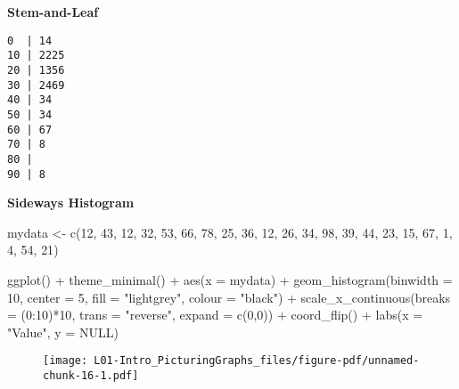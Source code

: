 \documentclass[
  letterpaper,
  DIV=11,
  numbers=noendperiod]{scrreprt}
\newenvironment{Shaded}{\begin{snugshade}}{\end{snugshade}}
\newcommand{\AttributeTok}[1]{\textcolor[rgb]{0.40,0.45,0.13}{#1}}
\newcommand{\ConstantTok}[1]{\textcolor[rgb]{0.56,0.35,0.01}{#1}}
\newcommand{\DecValTok}[1]{\textcolor[rgb]{0.68,0.00,0.00}{#1}}
\newcommand{\FunctionTok}[1]{\textcolor[rgb]{0.28,0.35,0.67}{#1}}
\newcommand{\NormalTok}[1]{\textcolor[rgb]{0.00,0.23,0.31}{#1}}
\newcommand{\OtherTok}[1]{\textcolor[rgb]{0.00,0.23,0.31}{#1}}
\newcommand{\SpecialCharTok}[1]{\textcolor[rgb]{0.37,0.37,0.37}{#1}}
\newcommand{\StringTok}[1]{\textcolor[rgb]{0.13,0.47,0.30}{#1}}
\begin{document}
\textbf{Stem-and-Leaf}

\begin{verbatim}
0  | 14
10 | 2225
20 | 1356
30 | 2469
40 | 34
50 | 34
60 | 67
70 | 8
80 |
90 | 8
\end{verbatim}

\textbf{Sideways Histogram}

\begin{Shaded}
\begin{Highlighting}[]
\NormalTok{mydata }\OtherTok{\textless{}{-}} \FunctionTok{c}\NormalTok{(}\DecValTok{12}\NormalTok{, }\DecValTok{43}\NormalTok{, }\DecValTok{12}\NormalTok{, }\DecValTok{32}\NormalTok{, }\DecValTok{53}\NormalTok{, }\DecValTok{66}\NormalTok{, }\DecValTok{78}\NormalTok{, }\DecValTok{25}\NormalTok{, }\DecValTok{36}\NormalTok{, }\DecValTok{12}\NormalTok{, }\DecValTok{26}\NormalTok{,}
    \DecValTok{34}\NormalTok{, }\DecValTok{98}\NormalTok{, }\DecValTok{39}\NormalTok{, }\DecValTok{44}\NormalTok{, }\DecValTok{23}\NormalTok{, }\DecValTok{15}\NormalTok{, }\DecValTok{67}\NormalTok{, }\DecValTok{1}\NormalTok{,  }\DecValTok{4}\NormalTok{,  }\DecValTok{54}\NormalTok{, }\DecValTok{21}\NormalTok{)}

\FunctionTok{ggplot}\NormalTok{() }\SpecialCharTok{+} \FunctionTok{theme\_minimal}\NormalTok{() }\SpecialCharTok{+}
    \FunctionTok{aes}\NormalTok{(}\AttributeTok{x =}\NormalTok{ mydata) }\SpecialCharTok{+}
    \FunctionTok{geom\_histogram}\NormalTok{(}\AttributeTok{binwidth =} \DecValTok{10}\NormalTok{, }\AttributeTok{center =} \DecValTok{5}\NormalTok{,}
        \AttributeTok{fill =} \StringTok{"lightgrey"}\NormalTok{, }\AttributeTok{colour =} \StringTok{"black"}\NormalTok{) }\SpecialCharTok{+}
    \FunctionTok{scale\_x\_continuous}\NormalTok{(}\AttributeTok{breaks =}\NormalTok{ (}\DecValTok{0}\SpecialCharTok{:}\DecValTok{10}\NormalTok{)}\SpecialCharTok{*}\DecValTok{10}\NormalTok{, }\AttributeTok{trans =} \StringTok{"reverse"}\NormalTok{, }\AttributeTok{expand =} \FunctionTok{c}\NormalTok{(}\DecValTok{0}\NormalTok{,}\DecValTok{0}\NormalTok{)) }\SpecialCharTok{+}
    \FunctionTok{coord\_flip}\NormalTok{() }\SpecialCharTok{+} 
    \FunctionTok{labs}\NormalTok{(}\AttributeTok{x =} \StringTok{"Value"}\NormalTok{, }\AttributeTok{y =} \ConstantTok{NULL}\NormalTok{)}
\end{Highlighting}
\end{Shaded}

\begin{figure}[H]

{\centering \texttt{[image: L01-Intro\_PicturingGraphs\_files/figure-pdf/unnamed-chunk-16-1.pdf]}

}

\end{figure}
\end{document}
